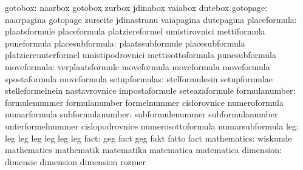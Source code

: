                          gotobox: naarbox                          gotobox
                                  zurbox                           jdinabox
                                  vaiabox                          dutebox  %
                        gotopage: naarpagina                       gotopage
                                  zurseite                         jdinastranu
                                  vaiapagina                       dutepagina
                    placeformula: plaatsformule                    placeformula
                                  platziereformel                  umistirovnici
                                  mettiformula                     puneformula
                 placesubformula: plaatssubformule                 placesubformula
                                  platziereunterformel             umistipodrovnici
                                  mettisottoformula                punesubformula
moveformula: verplaatsformule  moveformula
             moveformula       moveformula
             spostaformula       moveformula
                   setupformulas: stelformulesin                   setupformulae
                                  stelleformelnein                 nastavrovnice
                                  impostaformule                   seteazaformule
                   formulanumber: formulenummer                    formulanumber
                                  formelnummer                     cislorovnice
                                  numeroformula                    numarformula
                subformulanumber: subformulenummer                 subformulanumber
                                  unterformelnummer                cislopodrovnice
                                  numerosottoformula               numarsubformula
                             leg: leg                              leg
                                  leg                              leg
                                  leg                              leg
                            fact: geg                              fact
                                  geg                              fakt
                                  fatto                            fact
                     mathematics: wiskunde                         mathematics
                                  mathematik                       matematika
                                  matematica                       matematica
                       dimension: dimensie                         dimension
                                  dimension                        rozmer
